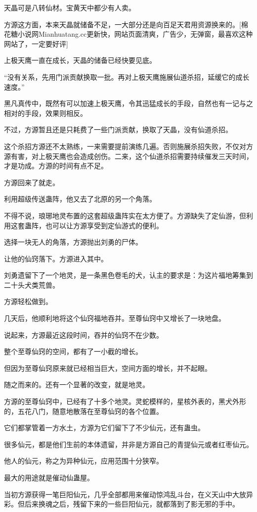 \begin{this_body}
天晶可是八转仙材。宝黄天中都少有人卖。

方源这方面，本来天晶就储备不足，一大部分还是向百足天君用资源换来的。[棉花糖小说网Mianhuatang.cc更新快，网站页面清爽，广告少，无弹窗，最喜欢这种网站了，一定要好评]

上极天鹰一直在成长，天晶的储备已经快要见底。

“没有关系，先用门派贡献换取一批。再对上极天鹰施展仙道杀招，延缓它的成长速度。”

黑凡真传中，既然有可以加速上极天鹰，令其迅猛成长的手段，自然也有一记与之相对的手段，效果则相反。

不过，方源暂且还是只耗费了一些门派贡献，换取了天晶，没有仙道杀招。

这个杀招方源还不太熟练，一来需要提前演练几遍。否则施展杀招失败，不仅对方源有害，对上极天鹰也会造成创伤。二来，这个仙道杀招需要持续催发三天时间，才是功成。方源的时间有点不足。

方源回来了就走。

利用超级传送蛊阵，他又去了北原的另一个角落。

不得不说，琅琊地灵布置的这套超级蛊阵实在太方便了。方源缺失了定仙游，但利用这套蛊阵，也可以让方源享受到定仙游式的便利。

选择一块无人的角落，方源抛出刘勇的尸体。

让他的仙窍落下。方源进入其中。

刘勇遗留下了一个地灵，是一条黑色卷毛的犬，认主的要求是：为这片福地筹集到二十头犬类荒兽。

方源轻松做到。

几天后，他顺利地将这个仙窍福地吞并。至尊仙窍中又增长了一块地盘。

说起来，方源最近这段时间，吞并的仙窍不在少数。

整个至尊仙窍的空间，都有了一小截的增长。

但因为至尊仙窍原来就已经相当巨大，空间方面的增长，并不起眼。

随之而来的。还有一个显著的改变，就是地灵。

方源的至尊仙窍中，已经有了十多个地灵。灵蛇模样的，星核外表的，黑犬外形的，五花八门，随意地散落在至尊仙窍的各个位置。

它们都掌管着一方水土，方源为它们留下了不少仙元，还有蛊虫。

很多仙元，都是他们生前的本体遗留，并非是方源自己的青提仙元或者红枣仙元。

他人的仙元，称之为异种仙元，应用范围十分狭窄。

最大的用途就是催动仙蛊屋。

当初方源获得一笔巨阳仙元，几乎全部都用来催动惊鸿乱斗台，在义天山中大放异彩。但后来换魂之后，残留下来的一些巨阳仙元，就都落到了影无邪的手中。


\end{this_body}
